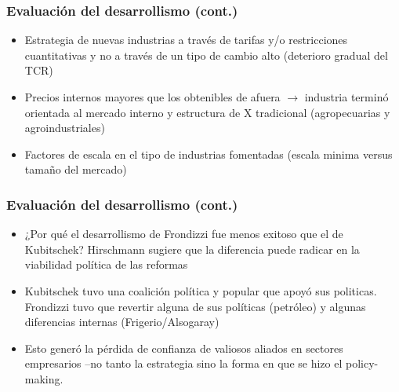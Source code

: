 \documentclass[14pt,aspectratio=169]{beamer}
\begin{document}
               \begin{frame}\frametitle{Evaluación del desarrollismo (cont.)}
                 \begin{itemize}\itemsep 5pt \medskip
                 \item Estrategia de nuevas industrias a través de
                   tarifas y/o restricciones cuantitativas y no a
                   través de un tipo de cambio alto (deterioro gradual
                   del TCR)
                   \item Precios internos mayores que los obtenibles
                     de afuera $\longrightarrow$ industria terminó
                     orientada al mercado interno y estructura de X
                     tradicional (agropecuarias y agroindustriales)
                     \item Factores de escala en el tipo de
                       industrias fomentadas (escala minima versus
                       tamaño del mercado)
                   \end{itemize}
               \end{frame}
               

                \begin{frame}\frametitle{Evaluación del desarrollismo (cont.)}
    \begin{itemize}\itemsep 10pt
    \item ¿Por qué el desarrollismo de Frondizzi fue menos exitoso que
      el de Kubitschek? Hirschmann sugiere que la diferencia puede
      radicar en la viabilidad política de las reformas
      \item Kubitschek tuvo una coalición política y
        popular que apoyó sus politicas. Frondizzi tuvo que revertir
        alguna de sus políticas (petróleo) y algunas diferencias
        internas (Frigerio/Alsogaray)
        \item Esto generó la pérdida de confianza de valiosos aliados
          en sectores empresarios --no tanto la estrategia sino la
          forma en que se hizo el policy-making. 
        \end{itemize}
               \end{frame}

               
               
\end{document}
